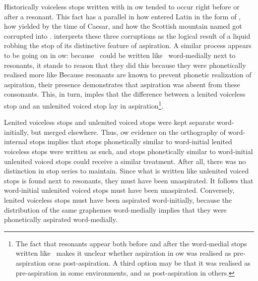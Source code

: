 Historically voiceless stops written with  in \gls{ow} tended to occur right before or after a resonant. This fact has a parallel in how  entered Latin in the form of , how  yielded  by the time of Caesar, and how the Scottish mountain named  got corrupted into . \textcite[§~25]{koch_*cothairche_1990} interprets these three corruptions as the logical result of a liquid robbing the stop of its distinctive feature of aspiration. A similar process appears to be going on in \gls{ow}: because \lT\  could be written like \xD\ word-medially next to resonants, it stands to reason that they did this because they were phonetically realised more like \xD\. Because resonants are known to prevent phonetic realization of aspiration, their presence demonstrates that  aspiration was absent from these consonants. This, in turn, imples that the difference between a lenited voiceless stop and an unlenited voiced stop lay in aspiration\footnote{The fact that resonants appear both before and after the word-medial stops written like \xD\ makes it unclear whether  aspiration in \gls{ow} was realised as pre-aspiration oras  post-aspiration. A third option may be that it was realised as pre-aspiration in some environments, and as post-aspiration in others.}.

Lenited voiceless stops and unlenited voiced stops were kept separate word-initially, but merged elsewhere. Thus, \gls{ow} evidence on the orthography of word-internal stops implies that stops phonetically similar to word-initial lenited voiceless stops were written as such, and stops phonetically similar to word-initial unlenited voiced stops could receive a similar treatment. After all, there was no distinction in stop series to maintain. Since what is written like unlenited voiced stops is found next to resonants, they must have been unaspirated. It follows that word-initial unlenited voiced stops must have been unaspirated. Conversely, lenited voiceless stops must have been aspirated  word-initially, because the distribution of the same graphemes word-medially implies that they were phonetically aspirated word-medially.

